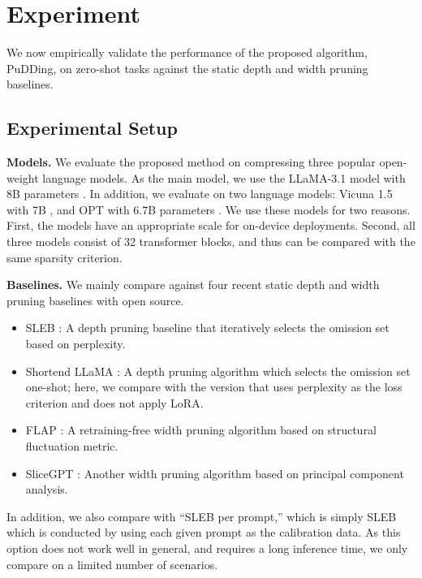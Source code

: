 
\section{Experiment}\label{sec:experiments}

We now empirically validate the performance of the proposed algorithm, PuDDing, on zero-shot tasks against the static depth and width pruning baselines.











\subsection{Experimental Setup}

\textbf{Models.} We evaluate the proposed method on compressing three popular open-weight language models. As the main model, we use the LLaMA-3.1 model with 8B parameters \citep{dubey2024llama}. In addition, we evaluate on two language models: Vicuna 1.5 with 7B \citep{vicuna2023}, and OPT with 6.7B parameters \citep{zhang2022opt}. We use these models for two reasons. First, the models have an appropriate scale for on-device deployments. Second, all three models consist of 32 transformer blocks, and thus can be compared with the same sparsity criterion.

\textbf{Baselines.} We mainly compare against four recent static depth and width pruning baselines with open source.
\begin{itemize}[leftmargin=*,itemsep=1.5pt,topsep=0pt,parsep=0pt]
\item SLEB \citep{songsleb}: A depth pruning baseline that iteratively selects the omission set based on perplexity.
\item Shortend LLaMA \citep{kim2024shortened}: A depth pruning algorithm which selects the omission set one-shot; here, we compare with the version that uses perplexity as the loss criterion and does not apply LoRA.
\item FLAP \citep{an2024flap}: A retraining-free width pruning algorithm based on structural fluctuation metric.
\item SliceGPT \citep{ashkboosslicegpt}: Another width pruning algorithm based on principal component analysis.
\end{itemize}
In addition, we also compare with ``SLEB per prompt,'' which is simply SLEB which is conducted by using each given prompt as the calibration data. As this option does not work well in general, and requires a long inference time, we only compare on a limited number of scenarios.


